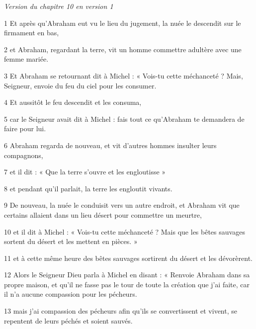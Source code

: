 
\par \textit{Version du chapitre 10 en version 1}

\par 1 Et après qu'Abraham eut vu le lieu du jugement, la nuée le descendit sur le firmament en bas,

\par 2 et Abraham, regardant la terre, vit un homme commettre adultère avec une femme mariée.

\par 3 Et Abraham se retournant dit à Michel : « Vois-tu cette méchanceté ? Mais, Seigneur, envoie du feu du ciel pour les consumer.

\par 4 Et aussitôt le feu descendit et les consuma,

\par 5 car le Seigneur avait dit à Michel : fais tout ce qu'Abraham te demandera de faire pour lui.

\par 6 Abraham regarda de nouveau, et vit d'autres hommes insulter leurs compagnons,

\par 7 et il dit : « Que la terre s'ouvre et les engloutisse »

\par 8 et pendant qu'il parlait, la terre les engloutit vivants.

\par 9 De nouveau, la nuée le conduisit vers un autre endroit, et Abraham vit que certains allaient dans un lieu désert pour commettre un meurtre,

\par 10 et il dit à Michel : « Vois-tu cette méchanceté ? Mais que les bêtes sauvages sortent du désert et les mettent en pièces. »

\par 11 et à cette même heure des bêtes sauvages sortirent du désert et les dévorèrent.

\par 12 Alors le Seigneur Dieu parla à Michel en disant : « Renvoie Abraham dans sa propre maison, et qu'il ne fasse pas le tour de toute la création que j'ai faite, car il n'a aucune compassion pour les pécheurs.

\par 13 mais j'ai compassion des pécheurs afin qu'ils se convertissent et vivent, se repentent de leurs péchés et soient sauvés.

